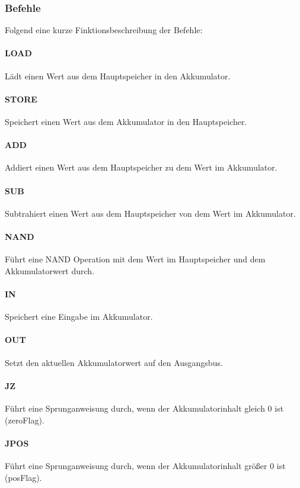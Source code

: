 \subsubsection{Befehle}

Folgend eine kurze Finktionsbeschreibung der Befehle:

\paragraph{LOAD} Lädt einen Wert aus dem Hauptspeicher in den Akkumulator.

\paragraph{STORE} Speichert einen Wert aus dem Akkumulator in den Hauptspeicher.

\paragraph{ADD} Addiert einen Wert aus dem Hauptspeicher zu dem Wert im Akkumulator.

\paragraph{SUB} Subtrahiert einen Wert aus dem Hauptspeicher von dem Wert im Akkumulator.

\paragraph{NAND} Führt eine NAND Operation mit dem Wert im Hauptspeicher und dem Akkumulatorwert durch.

\paragraph{IN} Speichert eine Eingabe im Akkumulator.

\paragraph{OUT} Setzt den aktuellen Akkumulatorwert auf den Ausgangsbus.

\paragraph{JZ} Führt eine Sprunganweisung durch, wenn der Akkumulatorinhalt gleich 0 ist (zeroFlag).

\paragraph{JPOS} Führt eine Sprunganweisung durch, wenn der Akkumulatorinhalt größer 0 ist (posFlag).

